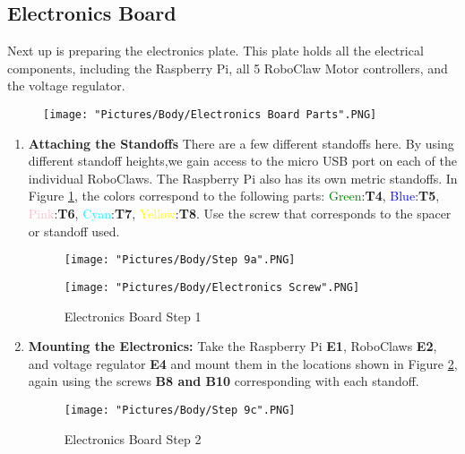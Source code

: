\documentclass[12pt]{article}
\begin{document}
\subsection{Electronics Board}

Next up is preparing the electronics plate. This plate holds all the electrical components, including the Raspberry Pi, all 5 RoboClaw Motor controllers, and the voltage regulator. 

\begin{figure}[H]
	\centering
	\texttt{[image: "Pictures/Body/Electronics Board Parts".PNG]}
\end{figure}



\begin{enumerate}
\item \textbf{Attaching the Standoffs} There are a few different standoffs here. By using different standoff heights,we gain access to the micro USB port on each of the individual RoboClaws. The Raspberry Pi also has its own metric standoffs. In Figure \ref{standoffs}, the colors correspond to the following parts: \textcolor{green}{Green}:\textbf{T4}, \textcolor{blue}{Blue}:\textbf{T5}, \textcolor{pink}{Pink}:\textbf{T6}, \textcolor{cyan}{Cyan}:\textbf{T7}, \textcolor{yellow}{Yellow}:\textbf{T8}. Use the screw that corresponds to the spacer or standoff used.

\begin{figure}[H]
  \centering
  \begin{minipage}[b]{0.50\textwidth}
    \texttt{[image: "Pictures/Body/Step 9a".PNG]}
  \end{minipage}
  \hfill
  \begin{minipage}[b]{0.35\textwidth}
    \texttt{[image: "Pictures/Body/Electronics Screw".PNG]}
  \end{minipage}

  \caption{Electronics Board Step 1}
  \label{standoffs}
\end{figure}

\item \textbf{Mounting the Electronics:} Take the Raspberry Pi \textbf{E1}, RoboClaws \textbf{E2}, and voltage regulator \textbf{E4} and mount them in the locations shown in Figure \ref{electronics board 2}, again using the screws \textbf{B8 and B10} corresponding with each standoff. 

\begin{figure}[H]
\centering	
  \texttt{[image: "Pictures/Body/Step 9c".PNG]}
  \caption{Electronics Board Step 2}
  \label{electronics board 2}
\end{figure}



\end{enumerate}
\end{document}
